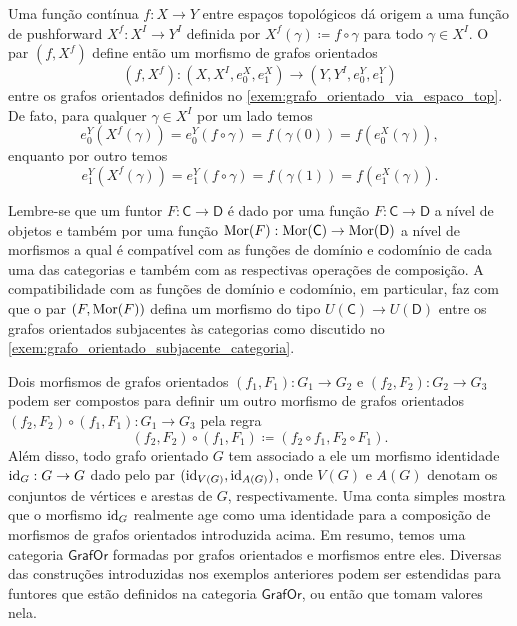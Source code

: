\begin{exem}
    Uma função contínua $f: X \to Y$ entre espaços topológicos dá origem a uma função de pushforward $X^f: X^I \to Y^{I}$ definida por $X^f(\gamma) \coloneqq f \circ \gamma$ para todo $\gamma \in X^{I}$.
    O par $(f,X^f)$ define então um morfismo de grafos orientados
    \begin{displaymath}
        (f,X^f): (X,X^I,e^X_0,e^X_1) \to (Y,Y^I,e^Y_0,e^Y_1)
    \end{displaymath}
    entre os grafos orientados definidos no \cref{exem:grafo_orientado_via_espaco_top}.
    De fato, para qualquer $\gamma \in X^I$ por um lado temos
    \begin{displaymath}
        e^Y_0(X^f(\gamma)) = e^Y_0(f \circ \gamma) = f(\gamma(0)) = f(e^X_0(\gamma)),
    \end{displaymath}
    enquanto por outro temos
    \begin{displaymath}
        e^Y_1(X^f(\gamma)) = e^Y_1(f \circ \gamma) = f(\gamma(1)) = f(e^X_1(\gamma)).
    \end{displaymath}
\end{exem}

\begin{exem}\label{exem:funtor_induz_morfismo_de_grafos}
    Lembre-se que um funtor $F: \mathsf{C} \to \mathsf{D}$ é dado por uma função $F: \mathsf{C} \to \mathsf{D}$ a nível de objetos e também por uma função $\mathrm{Mor}(F): \mathrm{Mor}(\mathsf{C}) \to \mathrm{Mor}(\mathsf{D})$ a nível de morfismos a qual é compatível com as funções de domínio e codomínio de cada uma das categorias e também com as respectivas operações de composição.
    A compatibilidade com as funções de domínio e codomínio, em particular, faz com que o par $(F,\mathrm{Mor}(F))$ defina um morfismo do tipo $U(\mathsf{C}) \to U(\mathsf{D})$ entre os grafos orientados subjacentes às categorias como discutido no \cref{exem:grafo_orientado_subjacente_categoria}.
\end{exem}

Dois morfismos de grafos orientados $(f_1,F_1): G_1 \to G_2$ e $(f_2,F_2): G_2 \to G_3$ podem ser compostos para definir um outro morfismo de grafos orientados $(f_2,F_2) \circ (f_1,F_1): G_1 \to G_3$ pela regra
\begin{displaymath}
    (f_2,F_2) \circ (f_1,F_1) \coloneqq (f_2 \circ f_1,F_2 \circ F_1).
\end{displaymath}
Além disso, todo grafo orientado $G$ tem associado a ele um morfismo identidade $\mathrm{id}_G: G \to G$ dado pelo par $(\mathrm{id}_{V(G)},\mathrm{id}_{A(G)})$, onde $V(G)$ e $A(G)$ denotam os conjuntos de vértices e arestas de $G$, respectivamente.
Uma conta simples mostra que o morfismo $\mathrm{id}_G$ realmente age como uma identidade para a composição de morfismos de grafos orientados introduzida acima.
Em resumo, temos uma categoria $\mathsf{GrafOr}$ formadas por grafos orientados e morfismos entre eles.
Diversas das construções introduzidas nos exemplos anteriores podem ser estendidas para funtores que estão definidos na categoria $\mathsf{GrafOr}$, ou então que tomam valores nela.

